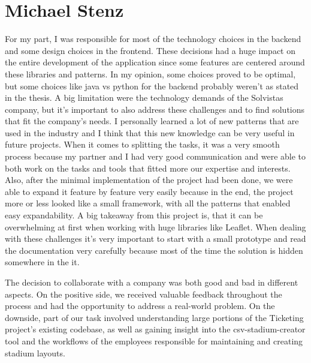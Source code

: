 \section{Michael Stenz}
For my part, I was responsible for most of the technology choices in the backend and some design choices in the frontend. These decisions had a huge impact on the entire development of the application since some features are centered around these libraries and patterns. In my opinion, some choices proved to be optimal, but some choices like java vs python for the backend probably weren't as stated in the thesis. A big limitation were the technology demands of the Solvistas company, but it's important to also address these challenges and to find solutions that fit the company's needs. I personally learned a lot of new patterns that are used in the industry and I think that this new knowledge can be very useful in future projects. When it comes to splitting the tasks, it was a very smooth process because my partner and I had very good communication and were able to both work on the tasks and tools that fitted more our expertise and interests. Also, after the minimal implementation of the project had been done, we were able to expand it feature by feature very easily because in the end, the project more or less looked like a small framework, with all the patterns that enabled easy expandability. A big takeaway from this project is, that it can be overwhelming at first when working with huge libraries like Leaflet. When dealing with these challenges it's very important to start with a small prototype and read the documentation very carefully because most of the time the solution is hidden somewhere in the it.

The decision to collaborate with a company was both good and bad in different aspects. On the positive side, we received valuable feedback throughout the process and had the opportunity to address a real-world problem. On the downside, part of our task involved understanding large portions of the Ticketing project's existing codebase, as well as gaining insight into the csv-stadium-creator tool and the workflows of the employees responsible for maintaining and creating stadium layouts.